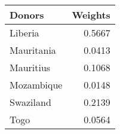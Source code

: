 \begin{tabular}{lr}
\toprule
    Donors &  Weights \\
\midrule
   Liberia &   0.5667 \\
Mauritania &   0.0413 \\
 Mauritius &   0.1068 \\
Mozambique &   0.0148 \\
 Swaziland &   0.2139 \\
      Togo &   0.0564 \\
\bottomrule
\end{tabular}
